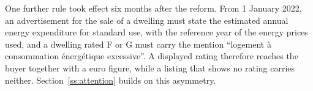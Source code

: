 One further rule took effect six months after the reform. From 1 January 2022, an advertisement for the sale of a dwelling must state the estimated annual energy expenditure for standard use, with the reference year of the energy prices used, and a dwelling rated F or G must carry the mention ``logement \`a consommation \'energ\'etique excessive''. A displayed rating therefore reaches the buyer together with a euro figure, while a listing that shows no rating carries neither. Section~\ref{ss:attention} builds on this asymmetry.
